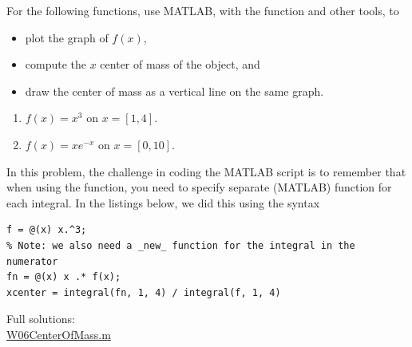 \begin{enumerate}[1.]
\begin{Question}
For the following functions, use MATLAB, with the \verb@integral@ function and other tools, to 
\begin{itemize}
\item plot the graph of $f(x)$, 
\item compute the $x$ center of mass of the object, and
\item draw the center of mass as a vertical line on the same graph.
\end{itemize}
\begin{enumerate}
\item  $f(x) = x^3$ on $x=[1, 4]$.
\item  $f(x) = x e^{-x}$ on $x=[0, 10]$.
\end{enumerate}

\end{Question}

\begin{Solution}
  In this problem, the challenge in coding the MATLAB script is to
  remember that when using the \verb@integral@ function, you need to
  specify separate (MATLAB) function for each integral. In the
  listings below, we did this using the syntax
\begin{verbatim}
f = @(x) x.^3;
% Note: we also need a _new_ function for the integral in the numerator
fn = @(x) x .* f(x);
xcenter = integral(fn, 1, 4) / integral(f, 1, 4)
\end{verbatim}
   
Full solutions: \\ 
\href{http://www.mast.queensu.ca/~apsc171/MNTCP01/PracticeProblems/MATLAB/W06CenterOfMass.m}{W06CenterOfMass.m}



\end{Solution}
\end{enumerate}
